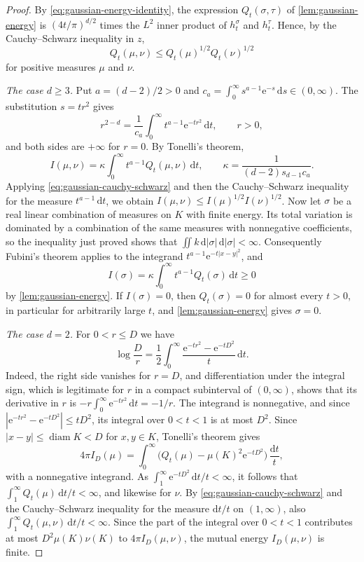 \begin{proof}
By \eqref{eq:gaussian-energy-identity}, the expression $Q_t(\sigma,\tau)$ of \cref{lem:gaussian-energy} is $(4t/\pi)^{d/2}$ times the $L^2$ inner product of $h_t^\sigma$ and $h_t^\tau$. Hence, by the Cauchy--Schwarz inequality in $z$,
\begin{equation}\label{eq:gaussian-cauchy-schwarz}
 Q_t(\mu,\nu)\leq Q_t(\mu)^{1/2}Q_t(\nu)^{1/2}
\end{equation}
for positive measures $\mu$ and $\nu$.

\emph{The case $d\geq3$.} Put $a=(d-2)/2>0$ and $c_a=\int_0^\infty s^{a-1}\mathrm e^{-s}\,\mathrm d s\in(0,\infty)$. The substitution $s=tr^2$ gives
\[
 r^{2-d}=\frac{1}{c_a}\int_0^\infty t^{a-1}\mathrm e^{-t r^2}\,\mathrm d t,\qquad r>0,
\]
and both sides are $+\infty$ for $r=0$. By Tonelli's theorem,
\[
 I(\mu,\nu)=\kappa\int_0^\infty t^{a-1}Q_t(\mu,\nu)\,\mathrm d t,\qquad \kappa=\frac{1}{(d-2)s_{d-1}c_a}.
\]
Applying \eqref{eq:gaussian-cauchy-schwarz} and then the Cauchy--Schwarz inequality for the measure $t^{a-1}\,\mathrm dt$, we obtain $I(\mu,\nu)\leq I(\mu)^{1/2}I(\nu)^{1/2}$. Now let $\sigma$ be a real linear combination of measures on $K$ with finite energy. Its total variation is dominated by a combination of the same measures with nonnegative coefficients, so the inequality just proved shows that $\iint k\,\mathrm d|\sigma|\,\mathrm d|\sigma|<\infty$. Consequently Fubini's theorem applies to the integrand $t^{a-1}\mathrm e^{-t|x-y|^2}$, and
\[
 I(\sigma)=\kappa\int_0^\infty t^{a-1}Q_t(\sigma)\,\mathrm d t\geq0
\]
by \cref{lem:gaussian-energy}. If $I(\sigma)=0$, then $Q_t(\sigma)=0$ for almost every $t>0$, in particular for arbitrarily large $t$, and \cref{lem:gaussian-energy} gives $\sigma=0$.

\emph{The case $d=2$.} For $0<r\leq D$ we have
\[
 \log\frac D r=\frac12\int_0^\infty\frac{\mathrm e^{-t r^2}-\mathrm e^{-tD^2}}{t}\,\mathrm d t.
\]
Indeed, the right side vanishes for $r=D$, and differentiation under the integral sign, which is legitimate for $r$ in a compact subinterval of $(0,\infty)$, shows that its derivative in $r$ is $-r\int_0^\infty\mathrm e^{-tr^2}\,\mathrm dt=-1/r$. The integrand is nonnegative, and since $|\mathrm e^{-t r^2}-\mathrm e^{-tD^2}|\leq tD^2$, its integral over $0<t<1$ is at most $D^2$. Since $|x-y|\leq\operatorname{diam}K<D$ for $x,y\in K$, Tonelli's theorem gives
\[
 4\pi I_D(\mu)=\int_0^\infty\bigl(Q_t(\mu)-\mu(K)^2\mathrm e^{-tD^2}\bigr)\,\frac{\mathrm d t}{t},
\]
with a nonnegative integrand. As $\int_1^\infty\mathrm e^{-tD^2}\,\mathrm dt/t<\infty$, it follows that $\int_1^\infty Q_t(\mu)\,\mathrm dt/t<\infty$, and likewise for $\nu$. By \eqref{eq:gaussian-cauchy-schwarz} and the Cauchy--Schwarz inequality for the measure $\mathrm dt/t$ on $(1,\infty)$, also $\int_1^\infty Q_t(\mu,\nu)\,\mathrm dt/t<\infty$. Since the part of the integral over $0<t<1$ contributes at most $D^2\mu(K)\nu(K)$ to $4\pi I_D(\mu,\nu)$, the mutual energy $I_D(\mu,\nu)$ is finite.


\end{proof}
